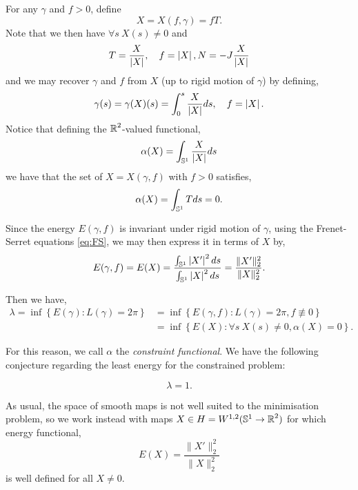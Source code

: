 \documentclass[12pt]{article}
\begin{document}
For any \(\gamma\) and \(f > 0\), define
\begin{equation}
\label{eq:X}
X = X(f, \gamma) = f T.
\end{equation}
Note that we then have \(\forall s \> X(s) \ne 0\) and
\begin{equation}
\label{eq:TNX}
T = \frac{X}{\left|{X}\right|}, \quad f = \left|{X}\right|, N = -J \frac{X}{\left|{X}\right|}
\end{equation}
and we may recover \(\gamma\) and \(f\) from \(X\) (up to rigid motion of \(\gamma\)) by defining,
\begin{equation}
\label{eq:gammaX}
\gamma(s) = \gamma (X) (s) = \int_0^s \frac{X}{\left|{X}\right|} ds, \quad f = \left|{X}\right|.
\end{equation}
Notice that defining the \(\operatorname{\mathbb{R}}^2\)-valued functional,
\begin{equation}
\label{eq:alpha}
\alpha(X) = \int_{\operatorname{\mathbb{S}^1}} \frac{X}{\left|{X}\right|} ds
\end{equation}
we have that the set of \(X = X(\gamma, f)\) with \(f > 0\) satisfies,
\[
\alpha(X) = \int_{\operatorname{\mathbb{S}^1}} T ds = 0.
\]

Since the energy \(E(\gamma, f)\) is invariant under rigid motion of \(\gamma\), using the Frenet-Serret equations \eqref{eq:FS}, we may then express it in terms of \(X\) by,
\begin{equation}
\label{eq:gammafX}
E(\gamma, f) = E(X) = \frac{\int_{\operatorname{\mathbb{S}^1}} \left|{X'}\right|^2 ds}{\int_{\operatorname{\mathbb{S}^1}} \left|{X}\right|^2 ds} = \frac{\|X'\|_2^2}{\|X\|_2^2}.
\end{equation}

Then we have,
\begin{equation}
\label{eq:infimums}
\begin{split}
\lambda = \inf\left\{E(\gamma) : L(\gamma) = 2\pi\right\} &= \inf\left\{E(\gamma, f) : L(\gamma) = 2\pi, f \not\equiv 0\right\} \\
&= \inf\left\{E(X) : \forall s \> X(s) \ne 0, \alpha(X) = 0\right\}.
\end{split}
\end{equation}

For this reason, we call \(\alpha\) the \emph{constraint functional}. We have the following conjecture regarding the least energy for the constrained problem:

\begin{conj}
\label{conj:main}
\[
\lambda = 1.
\]
\end{conj}

As usual, the space of smooth maps is not well suited to the minimisation problem, so we work instead with maps \(X \in H = W^{1,2} (\operatorname{\mathbb{S}^1} \to \operatorname{\mathbb{R}}^2)\) for which energy functional,
\[
E(X) = \frac{\|X'\|_2^2}{\|X\|_2^2}
\]
is well defined for all \(X \ne 0\).
\end{document}

